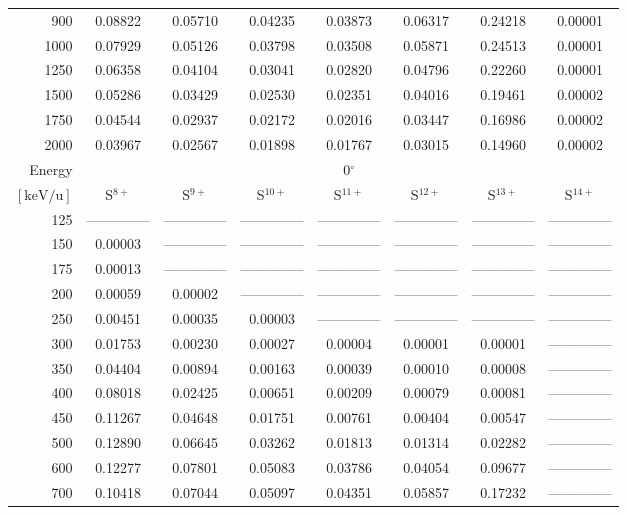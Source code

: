 \begin{table}[ht]
\begin{tabular}{r|c|c|c|c|c|c|c}
      900 & 0.08822 & 0.05710 & 0.04235 & 0.03873 & 0.06317 & 0.24218 & 0.00001 \\
     1000 & 0.07929 & 0.05126 & 0.03798 & 0.03508 & 0.05871 & 0.24513 & 0.00001 \\
     1250 & 0.06358 & 0.04104 & 0.03041 & 0.02820 & 0.04796 & 0.22260 & 0.00001 \\
     1500 & 0.05286 & 0.03429 & 0.02530 & 0.02351 & 0.04016 & 0.19461 & 0.00002 \\
     1750 & 0.04544 & 0.02937 & 0.02172 & 0.02016 & 0.03447 & 0.16986 & 0.00002 \\
     2000 & 0.03967 & 0.02567 & 0.01898 & 0.01767 & 0.03015 & 0.14960 & 0.00002 \\ \cline{1-8}
    Energy & \multicolumn{7}{c}{0$^\circ$} \\ \cline{2-8}
    $\mathrm{[keV/u]}$ & S$^{8+}$ & S$^{9+}$ & S$^{10+}$ & S$^{11+}$ & S$^{12+}$ & S$^{13+}$ & S$^{14+}$ \\ \cline{1-8}
      125 & -------------- & -------------- & -------------- & -------------- & -------------- & -------------- & -------------- \\
      150 & 0.00003 & -------------- & -------------- & -------------- & -------------- & -------------- & -------------- \\
      175 & 0.00013 & -------------- & -------------- & -------------- & -------------- & -------------- & -------------- \\
      200 & 0.00059 & 0.00002 & -------------- & -------------- & -------------- & -------------- & -------------- \\
      250 & 0.00451 & 0.00035 & 0.00003 & -------------- & -------------- & -------------- & -------------- \\
      300 & 0.01753 & 0.00230 & 0.00027 & 0.00004 & 0.00001 & 0.00001 & -------------- \\
      350 & 0.04404 & 0.00894 & 0.00163 & 0.00039 & 0.00010 & 0.00008 & -------------- \\
      400 & 0.08018 & 0.02425 & 0.00651 & 0.00209 & 0.00079 & 0.00081 & -------------- \\
      450 & 0.11267 & 0.04648 & 0.01751 & 0.00761 & 0.00404 & 0.00547 & -------------- \\
      500 & 0.12890 & 0.06645 & 0.03262 & 0.01813 & 0.01314 & 0.02282 & -------------- \\
      600 & 0.12277 & 0.07801 & 0.05083 & 0.03786 & 0.04054 & 0.09677 & -------------- \\
      700 & 0.10418 & 0.07044 & 0.05097 & 0.04351 & 0.05857 & 0.17232 & -------------- \\

\end{tabular}
\end{table}
